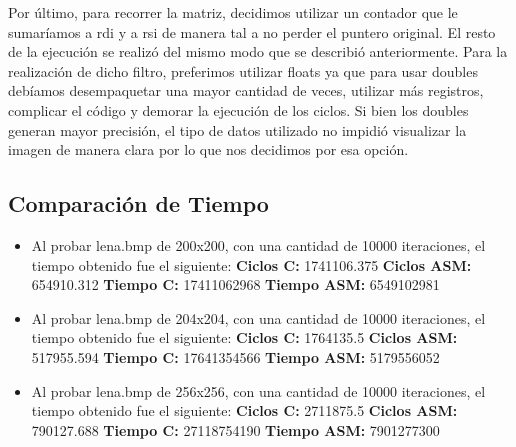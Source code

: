 \documentclass[10pt, a4paper]{article}
\begin{document}
\begin{itemize}
Por último, para recorrer la matriz, decidimos utilizar un contador que le sumaríamos a rdi y a rsi de manera tal a no perder el puntero original. El resto de la ejecución se realizó del mismo modo que se describió anteriormente.\newline
Para la realización de dicho filtro, preferimos utilizar floats ya que para usar doubles debíamos desempaquetar una mayor cantidad de veces, utilizar más registros, complicar el código y demorar la ejecución de los ciclos. Si bien los doubles generan mayor precisión, el tipo de datos utilizado no impidió visualizar la imagen de manera clara por lo que nos decidimos por esa opción.

\subsection{Comparación de Tiempo}

\begin{itemize}

\item{Al probar lena.bmp de 200x200, con una cantidad de 10000 iteraciones, el tiempo obtenido fue el siguiente:\newline
\newline
\textbf{Ciclos C:}                  1741106.375\newline
\vspace{0.15cm}
\textbf{Ciclos ASM:}               654910.312\newline
\textbf{Tiempo C:}                 17411062968\newline
\textbf{Tiempo ASM:}               6549102981\newline}

\item{Al probar lena.bmp de 204x204, con una cantidad de 10000 iteraciones, el tiempo obtenido fue el siguiente:\newline
\newline
\textbf{Ciclos C:}                 1764135.5\newline
\vspace{0.15cm}
\textbf{Ciclos ASM:}               517955.594\newline
\textbf{Tiempo C:}                 17641354566\newline
\textbf{Tiempo ASM:}               5179556052\newline}

\item{Al probar lena.bmp de 256x256, con una cantidad de 10000 iteraciones, el tiempo obtenido fue el siguiente:\newline
\newline
\textbf{Ciclos C:}                 2711875.5\newline
\vspace{0.15cm}
\textbf{Ciclos ASM:}                790127.688\newline
\textbf{Tiempo C:}                27118754190\newline
\textbf{Tiempo ASM:}                7901277300\newline}



\end{itemize}
\end{itemize}
\end{document}
